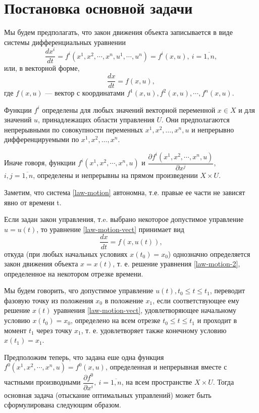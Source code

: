 \documentclass[14pt]{extreport}
\begin{document}
\section{Постановка основной задачи}
Мы будем предполагать, что закон движения объекта записывается в виде системы дифференциальных уравнении
\begin{equation}
\label{law-motion}
\dfrac{dx^i}{dt}=f^i(x^1,x^2,\cdots,x^n,u^1,\cdots,u^n)=f^i(x,u),\ i=\overline{1,n},
\end{equation}
или, в векторной форме,
\begin{equation}
\label{law-motion-vect}
\dfrac{dx}{dt}=f(x,u),
\end{equation}
где $f(x,u)$ — вектор с координатами $f^1(x,u),f^2(x,u),\cdots,f^n(x,u)$.

Функции $f^{i}$ определены для любых значений векторной переменной $x \in X$ и для значений $u$, принадлежащих области управления $U$. Они предполагаются непрерыв­ными по совокупности переменных $x^{1},x^{2},\dots,x^{n},u$
и непрерывно дифференцируемыми по $x^{1},x^{2},\dots,x^{n}$.

Иначе говоря, функции $f^i(x^1,x^2,\cdots,x^n,u)$ и $\dfrac{\partial f^i(x^1,x^2,\cdots,x^n,u)}{\partial x^j}$,\\ $i,j=\overline{1,n}$, определены и непрерывны на прямом произведении $X \times U$.

Заметим, что система \eqref{law-motion} автономна, т.е. правые ее части не зависят явно от времени t.

Если задан закон управления, т.e. выбрано некото­рое допустимое управление $u = u(t)$, то уравнение \eqref{law-motion-vect} принимает вид
\begin{equation}
\label{law-motion-2}
\dfrac{dx}{dt}=f(x,u(t)),
\end{equation}
откуда (при любых начальных условиях $x(t_{0}) = x_{0}$)
однозначно определяется закон движения объекта $x = x(t)$, т. е. решение уравнения \eqref{law-motion-2}, определенное на некотором отрезке времени.

Мы будем говорить, чго допустимое управление $u(t),t_{0}\leq t\leq t_{1}$, переводит фазовую точку из положения $x_{0}$ в положение $x_{1}$, если соответствующее ему решение $x(t)$ уравнения \eqref{law-motion-vect}, удовлетворяющее начальному условию $x(t_{0}) = x_{0}$, определено на всем отрезке $t_{0}\leq t \leq t_{1}$ и проходит в момент $t_{1}$ через точку $x_{1}$, т. е. удовлетворяет также конечному условию $x(t_{1}) = x_{1}$.

Предположим теперь, что задана еше одна функция $f^0(x^1,x^2,\cdots,x^n,u)=f^0(x,u)$, определенная и непрерывная вместе с частными производными $\dfrac{\partial f^0}{\partial x^i},\ i = \overline{1,n}$, на всем пространстве $X \times U$. Тогда основная задача (отыскание оптимальных управлений) может быть сформулирована следующим образом.
\end{document}
